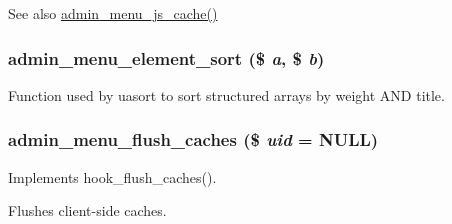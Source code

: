 \begin{DoxySeeAlso}{See also}
\hyperlink{admin__menu_8module_a199e7fc41af069dbf54a2e229cfec72b}{admin\_\-menu\_\-js\_\-cache()} 
\end{DoxySeeAlso}
\hypertarget{admin__menu_8module_a5be948b66b1a9aad706773c536a3f7ac}{
\subsubsection[{admin\_\-menu\_\-element\_\-sort}]{\setlength{\rightskip}{0pt plus 5cm}admin\_\-menu\_\-element\_\-sort (\$ {\em a}, \/  \$ {\em b})}}
\label{admin__menu_8module_a5be948b66b1a9aad706773c536a3f7ac}
Function used by uasort to sort structured arrays by weight AND title. \hypertarget{admin__menu_8module_a397aba2a3c508246b56d052faf29e9e4}{
\subsubsection[{admin\_\-menu\_\-flush\_\-caches}]{\setlength{\rightskip}{0pt plus 5cm}admin\_\-menu\_\-flush\_\-caches (\$ {\em uid} = {\ttfamily NULL})}}
\label{admin__menu_8module_a397aba2a3c508246b56d052faf29e9e4}
Implements hook\_\-flush\_\-caches().

Flushes client-\/side caches.


